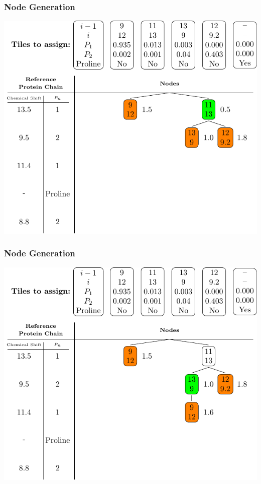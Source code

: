 \documentclass{beamer}
\begin{document}
\begin{frame}
	\frametitle{Node Generation}
	\vspace{-.5cm}
	\center
	\includegraphics[width=.9\textwidth]{tilePlacement/step4}
\end{frame}

\begin{frame}
	\frametitle{Node Generation} 
	\vspace{-.5cm}
	\center
	\includegraphics[width=.9\textwidth]{tilePlacement/step5}
\end{frame}
\end{document}
